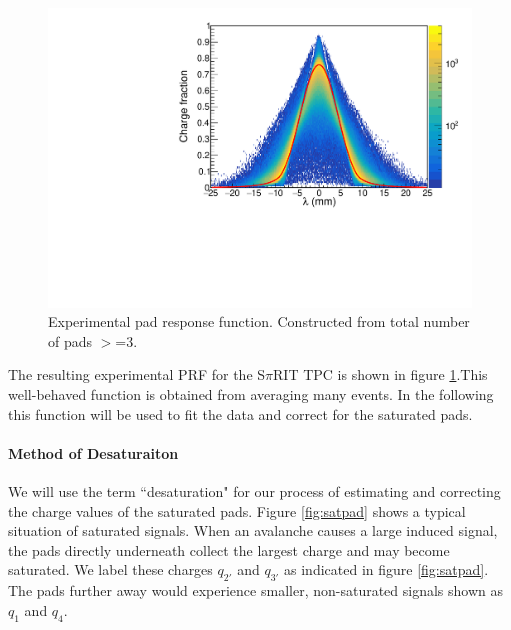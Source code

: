 \documentclass[review]{elsarticle}
\begin{document}
\begin{figure}[H]
\includegraphics[width=\linewidth]{expprf}
\caption{Experimental pad response function. Constructed from total number of pads $>$=3. }
\label{fig:expprf}
\end{figure}
The resulting experimental PRF for the S$\pi$RIT TPC is shown in figure \ref{fig:expprf}.This well-behaved function is obtained from averaging many events. In the following this function will be used to fit the data and correct for the saturated pads. 
\paragraph{Method of Desaturaiton}

We will use the term ``desaturation" for our process of estimating and correcting the charge values of the saturated pads. Figure \ref{fig:satpad} shows a typical situation of saturated signals. When an avalanche causes a large induced signal, the pads directly underneath collect the largest charge and may become saturated. We label these charges $q_{2'}$ and $q_{3'}$ as indicated in figure \ref{fig:satpad}. The pads further away would experience smaller, non-saturated signals shown as $q_{1}$ and $q_{4}$.
\end{document}
